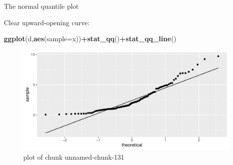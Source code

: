 \documentclass[ignorenonframetext,]{beamer}
\newenvironment{Shaded}{\begin{snugshade}}{\end{snugshade}}
\newcommand{\DataTypeTok}[1]{\textcolor[rgb]{0.13,0.29,0.53}{#1}}
\newcommand{\KeywordTok}[1]{\textcolor[rgb]{0.13,0.29,0.53}{\textbf{#1}}}
\newcommand{\NormalTok}[1]{#1}
\newcommand{\OperatorTok}[1]{\textcolor[rgb]{0.81,0.36,0.00}{\textbf{#1}}}
\begin{document}
\begin{frame}[fragile]{The normal quantile plot}
\protect\hypertarget{the-normal-quantile-plot-4}{}

Clear upward-opening curve:

\begin{Shaded}
\begin{Highlighting}[]
\KeywordTok{ggplot}\NormalTok{(d,}\KeywordTok{aes}\NormalTok{(}\DataTypeTok{sample=}\NormalTok{x))}\OperatorTok{+}\KeywordTok{stat_qq}\NormalTok{()}\OperatorTok{+}\KeywordTok{stat_qq_line}\NormalTok{()}
\end{Highlighting}
\end{Shaded}

\begin{figure}
\centering
\includegraphics{figure/unnamed-chunk-131-1.pdf}
\caption{plot of chunk unnamed-chunk-131}
\end{figure}

\end{frame}
\end{document}
